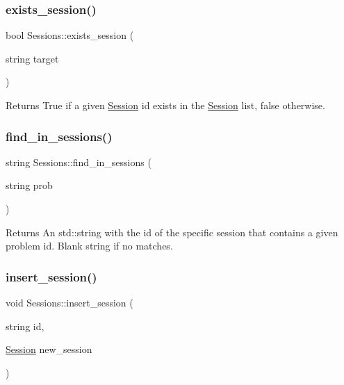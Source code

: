 \subsubsection{\texorpdfstring{exists\+\_\+session()}{exists\_session()}}
{\footnotesize\ttfamily bool Sessions\+::exists\+\_\+session (\begin{DoxyParamCaption}\item[{string}]{target }\end{DoxyParamCaption})}

\begin{DoxyReturn}{Returns}
True if a given \hyperlink{classSession}{Session} id exists in the \hyperlink{classSession}{Session} list, false otherwise. 
\end{DoxyReturn}
\mbox{\label{classSessions_a16396f8b9ae0bb03f382636a733f9aa5}} 
\subsubsection{\texorpdfstring{find\+\_\+in\+\_\+sessions()}{find\_in\_sessions()}}
{\footnotesize\ttfamily string Sessions\+::find\+\_\+in\+\_\+sessions (\begin{DoxyParamCaption}\item[{string}]{prob }\end{DoxyParamCaption})}

\begin{DoxyReturn}{Returns}
An std\+::string with the id of the specific session that contains a given problem id. Blank string if no matches. 
\end{DoxyReturn}
\mbox{\label{classSessions_a63bf568976dda1bfdd5d324930bf860b}} 
\subsubsection{\texorpdfstring{insert\+\_\+session()}{insert\_session()}}
{\footnotesize\ttfamily void Sessions\+::insert\+\_\+session (\begin{DoxyParamCaption}\item[{string}]{id,  }\item[{\hyperlink{classSession}{Session}}]{new\+\_\+session }\end{DoxyParamCaption})}

